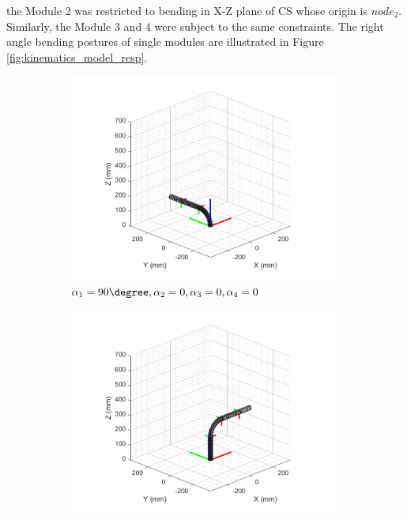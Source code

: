 the Module 2 was restricted to bending in X-Z plane of CS whose origin is $node_2$. Similarly, the Module 
3 and 4 were subject to the same constraints. The right angle bending postures of single modules are 
illustrated in Figure \ref{fig:kinematics_model_resp}.
\begin{figure}[H] %
    \centering 
    \captionsetup{labelsep=colon}
    \begin{subfigure}{0.48\textwidth} %
        \centering
        \includegraphics[width=\linewidth]{Image/MATLAB/manipulator_90_0_0_0.png}
        \caption{$\alpha_1=90 \degree,\alpha_2=0,\alpha_3=0,\alpha_4=0$}
    \end{subfigure}
    \hfill
    \begin{subfigure}{0.48\textwidth} %
        \centering
        \includegraphics[width=\linewidth]{Image/MATLAB/manipulator_0_90_0_0.png}

\end{subfigure}
\end{figure}
